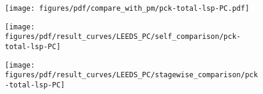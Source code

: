 \documentclass[10pt,twocolumn,letterpaper]{article}
\begin{document}
    \begin{subfigure}{0.33\textwidth}
   	     \centering
         \texttt{[image: figures/pdf/compare\_with\_pm/pck-total-lsp-PC.pdf]}
         \caption{}
         \label{fig:comp_with_pm}
    \end{subfigure}
    \begin{subfigure}{0.33\textwidth}
        \centering
        \texttt{[image: figures/pdf/result\_curves/LEEDS\_PC/self\_comparison/pck-total-lsp-PC]}
        \caption{}
        \label{fig:compare_training}
    \end{subfigure}
    \begin{subfigure}{0.33\textwidth}
        \centering
        \texttt{[image: figures/pdf/result\_curves/LEEDS\_PC/stagewise\_comparison/pck-total-lsp-PC]}
        \caption{}
        \label{fig:compare_stages}
    \end{subfigure}
\end{document}
